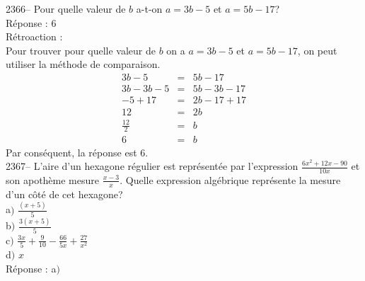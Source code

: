 \documentclass[letterpaper, 12pt]{article}
\begin{document}
2366-- Pour quelle valeur de $b$ a-t-on $a=3b-5$ et $a=5b-17$?\\

R\'eponse : 6\\

R\'etroaction :\\
Pour trouver pour quelle valeur de $b$ on a  $a=3b-5$ et $a=5b-17$, on peut utiliser la m\'ethode de comparaison.
\begin{eqnarray*}
 3b-5&=&5b-17\\
 3b-3b-5&=&5b-3b-17\\
-5+17&=&2b-17+17\\
12&=&2b\\[2mm]
\frac{12}{2}&=&b\\[2mm]
6&=&b
\end{eqnarray*}
Par cons\'equent, la r\'eponse est 6.\\

2367-- L'aire d'un hexagone r\'egulier est repr\'esent\'ee par l'expression $\frac{6x^{2}+12x-90}{10x}$ et son apoth\`eme mesure $\frac{x-3}{x}$. Quelle expression alg\'ebrique repr\'esente la mesure d'un c\^ot\'e de cet hexagone?\\

a$)$ $\frac{(x+5)}{5}$\\[2mm]
b$)$ $\frac{3(x+5)}{5}$\\[2mm]
c$)$ $\frac{3x}{5}+\frac{9}{10}-\frac{66}{5x}+\frac{27}{x^{2}}$\\[2mm]
d$)$ $x $\\

R\'eponse : a$)$\\
\end{document}
